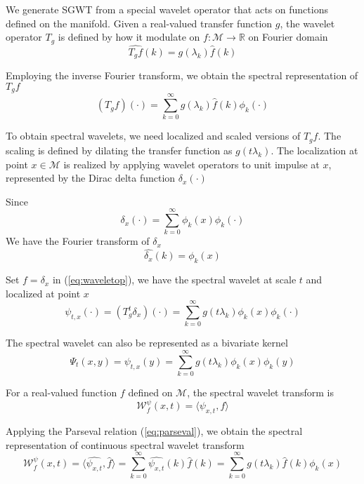 We generate SGWT from a special wavelet operator that acts on functions defined on the manifold. Given a real-valued transfer function $g$, the wavelet operator $T_g$ is defined by how it modulate on $f:\mathcal{M}\to\mathbb{R}$ on Fourier domain
\begin{equation}
\widehat{T_g f}(k)=g(\lambda_k)\hat{f}(k)
\end{equation}

Employing the inverse Fourier transform, we obtain the spectral representation of $T_g f$
\begin{equation}
\label{eq:waveletop}
(T_g f)(\cdot)=\sum_{k=0}^\infty g(\lambda_k)\hat{f}(k)\phi_k(\cdot)
\end{equation}

To obtain spectral wavelets, we need localized and scaled versions of $T_g f$. The scaling is defined by dilating the transfer function as $g(t\lambda_k)$. The localization at point $x\in\mathcal{M}$ is realized by applying wavelet operators to unit impulse at $x$, represented by the Dirac delta function $\delta_x(\cdot)$

Since
\begin{equation}
\delta_x(\cdot)=\sum_{k=0}^\infty\phi_k(x)\phi_k(\cdot)
\end{equation}
We have the Fourier transform of $\delta_x$
\begin{equation}
\hat{\delta_x}(k)=\phi_k(x)
\end{equation}

Set $f=\delta_x$ in (\ref{eq:waveletop}), we have the spectral wavelet at scale $t$ and localized at point $x$
\begin{equation}
\psi_{t,x}(\cdot)=(T^t_g\delta_x)(\cdot)=\sum_{k=0}^\infty g(t\lambda_k)\phi_k(x)\phi_k(\cdot)
\end{equation}

The spectral wavelet can also be represented as a bivariate kernel
\begin{equation}
\Psi_t(x,y)=\psi_{t,x}(y)=\sum_{k=0}^\infty g(t\lambda_k)\phi_k(x)\phi_k(y)
\end{equation}

For a real-valued function $f$ defined on $\mathcal{M}$, the spectral wavelet transform is
\begin{equation}
\mathcal{W}^\psi_f(x,t)=\langle\psi_{x,t},f\rangle
\end{equation}

Applying the Parseval relation (\ref{eq:parseval}), we obtain the spectral representation of continuous spectral wavelet transform
\begin{equation}
\mathcal{W}^\psi_f(x,t)=\langle\hat{\psi_{x,t}},\hat{f}\rangle=\sum_{k=0}^\infty\hat{\psi_{x,t}}(k)\hat{f}(k)=\sum_{k=0}^\infty g(t\lambda_k)\hat{f}(k)\phi_k(x)
\end{equation}

